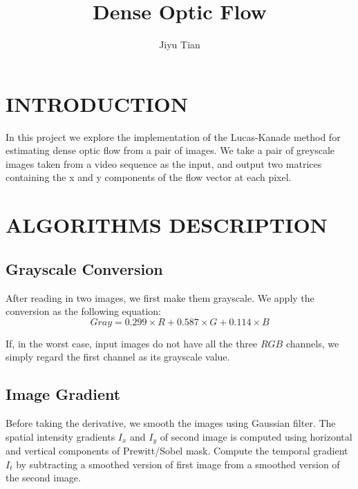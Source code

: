 \documentclass[letterpaper, 10 pt, conference]{ieeeconf}
\title{\Huge Dense Optic Flow}
\author{Jiyu Tian}
\begin{document}
\maketitle
\thispagestyle{empty}
\pagestyle{empty}


\section{INTRODUCTION}
In this project we explore the implementation of the Lucas-Kanade method for estimating dense optic flow from a pair of images. We take a pair of greyscale images taken from a video sequence as the input, and output two matrices containing the x and y components of the flow vector at each pixel.
\section{ALGORITHMS DESCRIPTION}


\subsection{Grayscale Conversion}
After reading in two images, we first make them grayscale. We apply the conversion as the following equation:
\begin{equation}
Gray = 0.299 \times R + 0.587 \times G + 0.114 \times B
\end{equation}

If, in the worst case, input images do not have all the three $RGB$ channels, we simply regard the first channel as its grayscale value.



\subsection{Image Gradient}
Before taking the derivative, we smooth the images using Gaussian filter. The spatial intensity gradients $I_x$ and $I_y$ of second image is computed using horizontal and vertical components of Prewitt/Sobel mask. Compute the temporal gradient $I_t$ by subtracting a smoothed version of first image from a smoothed version of the second image.
\end{document}
